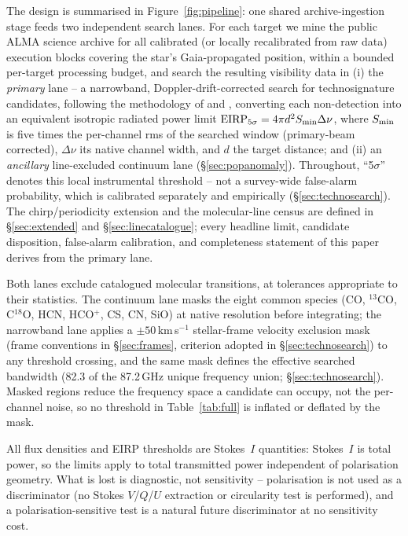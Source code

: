 \documentclass{openjournal}
\begin{document}
The design is summarised in Figure~\ref{fig:pipeline}: one shared
archive-ingestion stage feeds two independent search lanes. For each
target we mine the public ALMA science archive for all calibrated (or
locally recalibrated from raw data) execution blocks covering the
star's Gaia-propagated position, within a bounded per-target
processing budget, and search the resulting visibility data in (i) the
\emph{primary} lane -- a narrowband, Doppler-drift-corrected search
for technosignature candidates, following the methodology of
\citet{Mason2024} and \citet{Enriquez2017}, converting each
non-detection into an equivalent isotropic radiated power limit
$\mathrm{EIRP_{5\sigma}} = 4\pi d^{2} S_{\rm min} \Delta\nu$, where
$S_{\rm min}$ is five times the per-channel rms of the searched window
(primary-beam corrected), $\Delta\nu$ its native channel width, and
$d$ the target distance; and (ii) an \emph{ancillary} line-excluded
continuum lane (\S\ref{sec:popanomaly}). Throughout, ``5$\sigma$''
denotes this local instrumental threshold -- not a survey-wide
false-alarm probability, which is calibrated separately and
empirically (\S\ref{sec:technosearch}). The chirp/periodicity
extension and the molecular-line census are defined in
\S\ref{sec:extended} and \S\ref{sec:linecatalogue}; every headline
limit, candidate disposition, false-alarm calibration, and
completeness statement of this paper derives from the primary lane.

Both lanes exclude catalogued molecular transitions, at tolerances
appropriate to their statistics. The continuum lane masks the eight
common species (CO, $^{13}$CO, C$^{18}$O, HCN, HCO$^{+}$, CS, CN,
SiO) at native resolution before integrating; the narrowband lane
applies a $\pm50$\,km\,s$^{-1}$ stellar-frame velocity exclusion mask
(frame conventions in \S\ref{sec:frames}, criterion adopted in
\S\ref{sec:technosearch}) to any threshold crossing, and the same mask
defines the effective searched bandwidth (82.3 of the 87.2\,GHz
unique frequency union; \S\ref{sec:technosearch}). Masked regions
reduce the frequency space a candidate can occupy, not the per-channel
noise, so no threshold in Table~\ref{tab:full} is inflated or deflated
by the mask.

All flux densities and EIRP thresholds are Stokes~$I$ quantities:
Stokes~$I$ is total power, so the limits apply to total transmitted
power independent of polarisation geometry. What is lost is
diagnostic, not sensitivity -- polarisation is not used as a
discriminator (no Stokes $V$/$Q$/$U$ extraction or circularity test is
performed), and a polarisation-sensitive test is a natural future
discriminator at no sensitivity cost.
\end{document}
